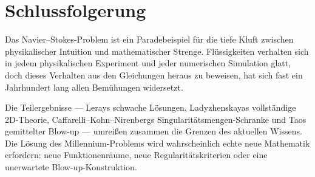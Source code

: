\documentclass[12pt,a4paper]{article}
\theoremstyle{remark}
\begin{document}
\section{Schlussfolgerung}

Das Navier--Stokes-Problem ist ein Paradebeispiel für die tiefe Kluft zwischen
physikalischer Intuition und mathematischer Strenge. Flüssigkeiten verhalten sich in jedem
physikalischen Experiment und jeder numerischen Simulation glatt, doch dieses Verhalten
aus den Gleichungen heraus zu beweisen, hat sich fast ein Jahrhundert lang allen
Bemühungen widersetzt.

Die Teilergebnisse — Lerays schwache Lösungen, Ladyzhenskayas vollständige 2D-Theorie,
Caffarelli--Kohn--Nirenbergs Singularitätsmengen-Schranke und Taos gemittelter Blow-up —
umreißen zusammen die Grenzen des aktuellen Wissens. Die Lösung des Millennium-Problems
wird wahrscheinlich echte neue Mathematik erfordern: neue Funktionenräume, neue
Regularitätskriterien oder eine unerwartete Blow-up-Konstruktion.
\end{document}
